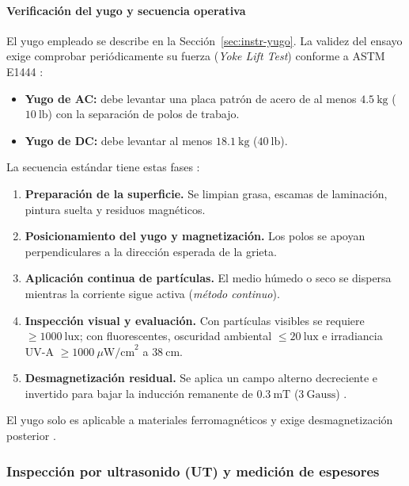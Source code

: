 \paragraph{Verificación del yugo y secuencia operativa}

El yugo empleado se describe en la Sección~\ref{sec:instr-yugo}. La validez del
ensayo exige comprobar periódicamente su fuerza (\textit{Yoke Lift Test})
conforme a ASTM E1444 \parencite{astm_e1444}:

\begin{itemize}
  \item \textbf{Yugo de AC:} debe levantar una placa patrón de acero de al menos
        $4.5\ \text{kg}$ ($10\ \text{lb}$) con la separación de polos de trabajo.
  \item \textbf{Yugo de DC:} debe levantar al menos $18.1\ \text{kg}$
        ($40\ \text{lb}$).
\end{itemize}

La secuencia estándar tiene estas fases \parencite{iso9934_1}:

\begin{enumerate}
  \item \textbf{Preparación de la superficie.} Se limpian grasa, escamas de
        laminación, pintura suelta y residuos magnéticos.
  \item \textbf{Posicionamiento del yugo y magnetización.} Los polos se apoyan
        perpendiculares a la dirección esperada de la grieta.
  \item \textbf{Aplicación continua de partículas.} El medio húmedo o seco se
        dispersa mientras la corriente sigue activa (\textit{método continuo}).
  \item \textbf{Inspección visual y evaluación.} Con partículas visibles se requiere
        $\ge 1000\ \text{lux}$; con fluorescentes, oscuridad ambiental
        $\le 20\ \text{lux}$ e irradiancia UV-A
        $\ge 1000\ \mu\text{W/cm}^2$ a $38\ \text{cm}$.
  \item \textbf{Desmagnetización residual.} Se aplica un campo alterno decreciente e
        invertido para bajar la inducción remanente de $0.3\ \text{mT}$
        ($3\ \text{Gauss}$) \parencite{astm_e1444}.
\end{enumerate}

El yugo solo es aplicable a materiales ferromagnéticos y exige desmagnetización
posterior \parencite{astm_e1444}.

\subsubsection{Inspección por ultrasonido (UT) y medición de espesores}
\label{sec:ut}

